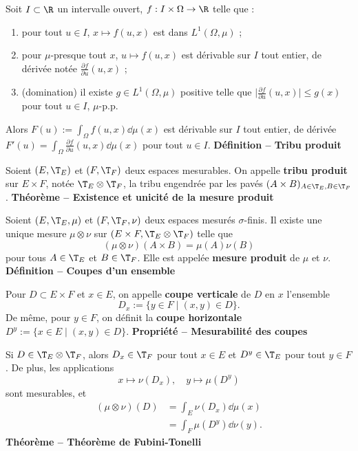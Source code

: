 Soit $I\subset\R$ un intervalle ouvert, $f:I\times\Omega\to\R$ telle que :
\begin{enumerate}
\item pour tout $u\in I$, $x\mapsto f(u,x)$ est dans $L^1(\Omega,\mu)$ ;
\item pour $\mu$-presque tout $x$, $u\mapsto f(u,x)$ est dérivable sur $I$ tout entier, de dérivée notée $\frac{\partial f}{\partial u}(u,x)$ ;
\item (domination) il existe $g\in L^1(\Omega,\mu)$ positive telle que $\bigl|\frac{\partial f}{\partial u}(u,x)\bigr|\le g(x)$ pour tout $u\in I$, $\mu$-p.p.
\end{enumerate}
Alors $F(u):=\int_\Omega f(u,x)\dd\mu(x)$ est dérivable sur $I$ tout entier, de dérivée $F'(u)=\int_\Omega\frac{\partial f}{\partial u}(u,x)\dd\mu(x)$ pour tout $u\in I$.
\textbf{Définition – Tribu produit}

Soient $(E,\T_E)$ et $(F,\T_F)$ deux espaces mesurables. On appelle \textbf{tribu produit} sur $E\times F$, notée $\T_E\otimes\T_F$, la tribu engendrée par les pavés $(A\times B)_{A\in\T_E,B\in\T_F}$.
\textbf{Théorème – Existence et unicité de la mesure produit}

Soient $(E,\T_E,\mu)$ et $(F,\T_F,\nu)$ deux espaces mesurés $\sigma$-finis. Il existe une unique mesure $\mu\otimes\nu$ sur $(E\times F,\T_E\otimes\T_F)$ telle que
\[(\mu\otimes\nu)(A\times B)=\mu(A)\nu(B)\]
pour tous $A\in\T_E$ et $B\in\T_F$. Elle est appelée \textbf{mesure produit} de $\mu$ et $\nu$.
\textbf{Définition – Coupes d’un ensemble}

Pour $D\subset E\times F$ et $x\in E$, on appelle \textbf{coupe verticale} de $D$ en $x$ l’ensemble
\[D_x:=\{y\in F\mid(x,y)\in D\}.\]
De même, pour $y\in F$, on définit la \textbf{coupe horizontale} $D^y:=\{x\in E\mid(x,y)\in D\}$.
\textbf{Propriété – Mesurabilité des coupes}

Si $D\in\T_E\otimes\T_F$, alors $D_x\in\T_F$ pour tout $x\in E$ et $D^y\in\T_E$ pour tout $y\in F$. De plus, les applications
\[x\longmapsto\nu(D_x),\quad y\longmapsto\mu(D^y)\]
sont mesurables, et
\[
\begin{aligned}
(\mu\otimes\nu)(D)&=\int_E\nu(D_x)\dd\mu(x)\\
&=\int_F\mu(D^y)\dd\nu(y).
\end{aligned}
\]
\textbf{Théorème – Théorème de Fubini-Tonelli}

